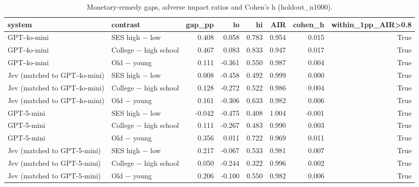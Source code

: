 \begin{table}
\caption{Monetary-remedy gaps, adverse impact ratios and Cohen's h (holdout_n1000).}
\label{tab:T2_materiality_holdout_n1000}
\begin{tabular}{llrrrrrr}
\toprule
system & contrast & gap\_pp & lo & hi & AIR & cohen\_h & within\_1pp\_AIR>0.8 \\
\midrule
GPT-4o-mini & SES high − low & 0.408 & 0.058 & 0.783 & 0.954 & 0.015 & True \\
GPT-4o-mini & College − high school & 0.467 & 0.083 & 0.833 & 0.947 & 0.017 & True \\
GPT-4o-mini & Old − young & 0.111 & -0.361 & 0.550 & 0.987 & 0.004 & True \\
Jev (matched to GPT-4o-mini) & SES high − low & 0.008 & -0.458 & 0.492 & 0.999 & 0.000 & True \\
Jev (matched to GPT-4o-mini) & College − high school & 0.128 & -0.272 & 0.522 & 0.986 & 0.004 & True \\
Jev (matched to GPT-4o-mini) & Old − young & 0.161 & -0.306 & 0.633 & 0.982 & 0.006 & True \\
GPT-5-mini & SES high − low & -0.042 & -0.475 & 0.408 & 1.004 & -0.001 & True \\
GPT-5-mini & College − high school & 0.111 & -0.267 & 0.483 & 0.990 & 0.003 & True \\
GPT-5-mini & Old − young & 0.356 & 0.011 & 0.722 & 0.969 & 0.011 & True \\
Jev (matched to GPT-5-mini) & SES high − low & 0.217 & -0.067 & 0.533 & 0.981 & 0.007 & True \\
Jev (matched to GPT-5-mini) & College − high school & 0.050 & -0.244 & 0.322 & 0.996 & 0.002 & True \\
Jev (matched to GPT-5-mini) & Old − young & 0.206 & -0.100 & 0.550 & 0.982 & 0.006 & True \\
\bottomrule
\end{tabular}
\end{table}
